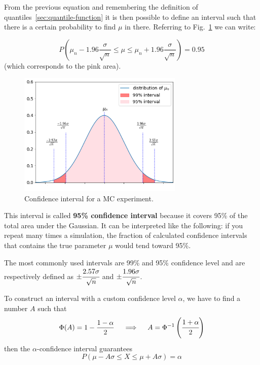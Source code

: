 From the previous equation and remembering the definition of quantiles~\ref{sec:quantile-function} it is then possible to define an interval such that there is a certain probability to find $\mu$ in there. Referring to Fig.~\ref{fig:confidence_interval} we can write:

\begin{equation}
P\left(\mu_n - 1.96\frac{\sigma}{\sqrt{n}}\le \mu \le \mu_n + 1.96\frac{\sigma}{\sqrt{n}}\right) = 0.95
\end{equation}
(which corresponds to the pink area).

\begin{figure}[htb]
\centering
\includegraphics[width=0.7\textwidth]{figures/confidence_interval}
\caption{Confidence interval for a MC experiment.}
\label{fig:confidence_interval}
\end{figure}

This interval is called \textbf{95\% confidence interval} because it covers 95\% of the total area under the Gaussian. It can be interpreted like the following: if you repeat many times a simulation, the fraction of calculated confidence intervals that contains the true parameter $\mu$ would tend toward 95\%.

The most commonly used intervals are 99\% and 95\% confidence level and are respectively defined as \(\pm \cfrac{2.57\sigma}{\sqrt{n}}\) and \(\pm \cfrac{1.96\sigma}{\sqrt{n}}\).

To construct an interval with a custom confidence level $\alpha$, we have to find a number $A$ such that
\begin{equation}
\Phi(A) = 1 - \frac{1-\alpha}{2}\quad\implies\quad A = \Phi^{-1}\left(\cfrac{1+\alpha}{2}\right)
\label{for:A}
\end{equation}
then the $\alpha$-confidence interval guarantees
\begin{equation}
P(\mu - A\sigma \le X \le \mu+ A\sigma) = \alpha 
\end{equation}

